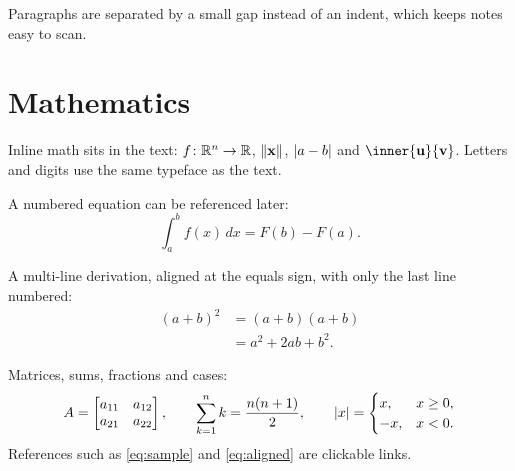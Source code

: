 Paragraphs are separated by a small gap instead of an indent, which keeps
notes easy to scan.

\section{Mathematics}\label{sec:math}

Inline math sits in the text: $f\colon \mathbb{R}^n \to \mathbb{R}$, $\lVert\mathbf{x}\rVert$,
$\lvert a - b\rvert$ and $\inner{\vect{u}}{\vect{v}}$. Letters and digits use the same
typeface as the text.

A numbered equation can be referenced later:
\begin{equation}\label{eq:sample}
  \int_a^b f(x)\,dx = F(b) - F(a).
\end{equation}

A multi-line derivation, aligned at the equals sign, with only the last line
numbered:
\begin{align}
  (a + b)^2 &= (a + b)(a + b) \nonumber\\
            &= a^2 + 2ab + b^2. \label{eq:aligned}
\end{align}

Matrices, sums, fractions and cases:
\[
  A = \begin{bmatrix} a_{11} & a_{12} \\ a_{21} & a_{22} \end{bmatrix},
  \qquad
  \sum_{k=1}^{n} k = \frac{n(n+1)}{2},
  \qquad
  \lvert x\rvert = \begin{cases} x, & x \ge 0, \\ -x, & x < 0. \end{cases}
\]
References such as \eqref{eq:sample} and \eqref{eq:aligned} are clickable links.
